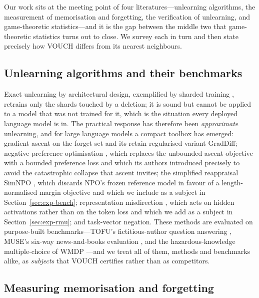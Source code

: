 Our work sits at the meeting point of four literatures---unlearning algorithms, the
measurement of memorisation and forgetting, the verification of unlearning, and
game-theoretic statistics---and it is the gap between the middle two that
game-theoretic statistics turns out to close. We survey each in turn and then state
precisely how VOUCH differs from its nearest neighbours.

\subsection{Unlearning algorithms and their benchmarks}

Exact unlearning by architectural design, exemplified by sharded training
\citep{bourtoule2021machine}, retrains only the shards touched by a deletion; it is
sound but cannot be applied to a model that was not trained for it, which is the
situation every deployed language model is in. The practical response has therefore
been \emph{approximate} unlearning, and for large language models a compact toolbox
has emerged: gradient ascent on the forget set and its retain-regularised variant
GradDiff; negative preference optimisation \citep{zhang2024npo}, which replaces the
unbounded ascent objective with a bounded preference loss and which its authors
introduced precisely to avoid the catastrophic collapse that ascent invites; the
simplified reappraisal SimNPO \citep{fan2025simnpo}, which discards NPO's frozen
reference model in favour of a length-normalised margin objective and which we
include as a subject in Section~\ref{sec:exp-bench}; representation misdirection
\citep{li2024wmdp}, which acts on hidden activations rather than on the token loss and
which we add as a subject in Section~\ref{sec:exp-rmu}; and task-vector negation. These methods are evaluated on
purpose-built benchmarks---TOFU's fictitious-author question answering
\citep{maini2024tofu}, MUSE's six-way news-and-books evaluation \citep{shi2024muse},
and the hazardous-knowledge multiple-choice of WMDP \citep{li2024wmdp}---and we treat
all of them, methods and benchmarks alike, as \emph{subjects} that VOUCH certifies
rather than as competitors.

\subsection{Measuring memorisation and forgetting}

